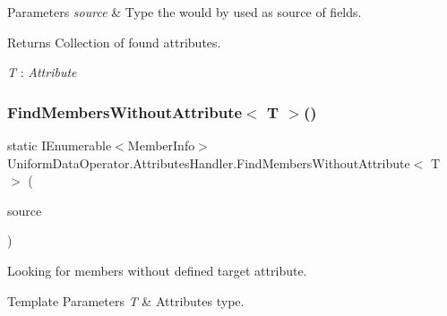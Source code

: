 \begin{DoxyParams}{Parameters}
{\em source} & Type the would by used as source of fields.\\
\hline
\end{DoxyParams}
\begin{DoxyReturn}{Returns}
Collection of found attributes.
\end{DoxyReturn}
\begin{Desc}
\item[Type Constraints]\begin{description}
\item[{\em T} : {\em Attribute}]\end{description}
\end{Desc}
\mbox{\label{class_uniform_data_operator_1_1_attributes_handler_a0a4cca8daa161032ea820531b35695d7}} 
\subsubsection{\texorpdfstring{Find\+Members\+Without\+Attribute$<$ T $>$()}{FindMembersWithoutAttribute< T >()}\hspace{0.1cm}{\footnotesize\ttfamily [2/2]}}
{\footnotesize\ttfamily static I\+Enumerable$<$Member\+Info$>$ Uniform\+Data\+Operator.\+Attributes\+Handler.\+Find\+Members\+Without\+Attribute$<$ T $>$ (\begin{DoxyParamCaption}\item[{I\+Enumerable$<$ Member\+Info $>$}]{source }\end{DoxyParamCaption})\hspace{0.3cm}{\ttfamily [static]}}



Looking for members without defined target attribute. 


\begin{DoxyTemplParams}{Template Parameters}
{\em T} & Attribute\textquotesingle{}s type.\\
\hline
\end{DoxyTemplParams}

